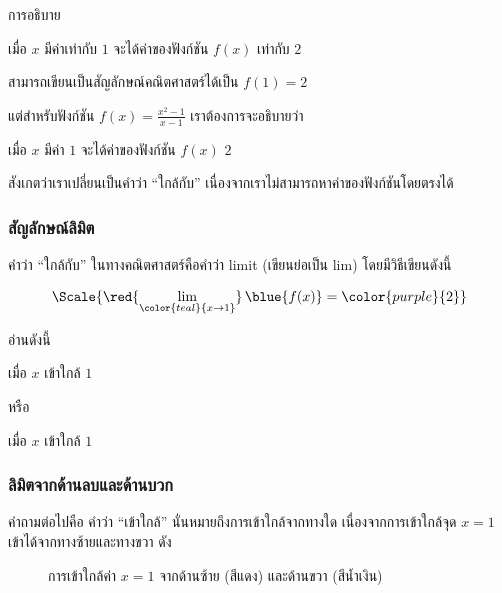 \begin{frame}
การอธิบาย 
\begin{remark}{}
\begin{center}
เมื่อ $x$ มีค่าเท่ากับ $1$ จะได้ค่าของฟังก์ชัน $f(x)$ เท่ากับ $2$
\end{center}
\end{remark}

สามารถเขียนเป็นสัญลักษณ์คณิตศาสตร์ได้เป็น $f(1) = 2$ 

แต่สำหรับฟังก์ชัน $f(x) = \frac{x^2-1}{x-1}$ เราต้องการจะอธิบายว่า
\begin{remark}{}
\begin{center}
เมื่อ $x$ มีค่า $1$ จะได้ค่าของฟังก์ชัน $f(x)$  $2$
\end{center}
\end{remark}

สังเกตว่าเราเปลี่ยนเป็นคำว่า ``ใกล้กับ'' เนื่องจากเราไม่สามารถหาค่าของฟังก์ชันโดยตรงได้
\end{frame}

\begin{frame}
\frametitle{สัญลักษณ์ลิมิต}
คำว่า ``ใกล้กับ'' ในทางคณิตศาสตร์คือคำว่า limit (เขียนย่อเป็น lim) โดยมีวิธีเขียนดังนี้

\[ \Scale{\red{\lim_{\color{teal}{x \rightarrow 1}}} \, \blue{f(x)} = \color{purple}{2}}\]

อ่านดังนี้

\begin{center}
 \color{teal}เมื่อ $x$ เข้าใกล้ $1$  \color{purple}{มีค่าเท่ากับ $2$}
\end{center}

หรือ

\begin{center}
  \color{teal}เมื่อ $x$ เข้าใกล้ $1$  \color{purple}{มีค่าเท่ากับ $2$}
\end{center}
\end{frame}


\begin{frame}
\frametitle{ลิมิตจากด้านลบและด้านบวก}
คำถามต่อไปคือ คำว่า ``เข้าใกล้'' นั่นหมายถึงการเข้าใกล้จากทางใด เนื่องจากการเข้าใกล้จุด $x=1$ เข้าได้จากทางซ้ายและทางขวา ดัง

\begin{figure}[h!]
\centering
{}
\caption{การเข้าใกล้ค่า $x=1$ จากด้านซ้าย (สีแดง) และด้านขวา (สีน้ำเงิน)}
\label{fig:limit_left_right_intro}
\end{figure}
\end{frame}

